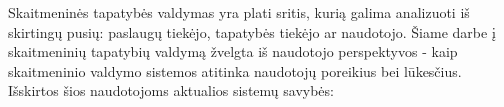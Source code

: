 Skaitmeninės tapatybės valdymas yra plati sritis, kurią galima analizuoti iš skirtingų pusių: paslaugų tiekėjo, tapatybės tiekėjo ar naudotojo.
Šiame darbe į skaitmeninių tapatybių valdymą žvelgta iš naudotojo perspektyvos - kaip skaitmeninio valdymo sistemos atitinka naudotojų poreikius
bei lūkesčius. Išskirtos šios naudotojoms aktualios sistemų savybės:



